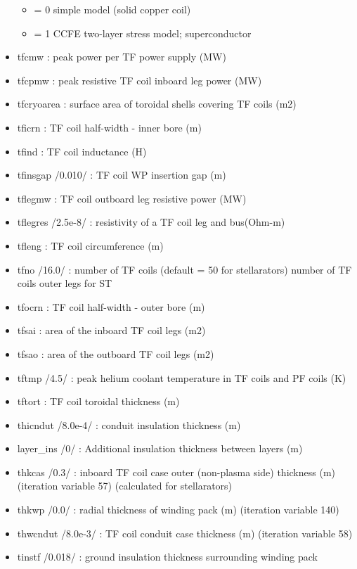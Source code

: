 \documentclass[]{article}
\providecommand{\tightlist}{%
  \setlength{\itemsep}{0pt}\setlength{\parskip}{0pt}}
\begin{document}
\begin{itemize}
  \begin{itemize}
  \tightlist
  \item
    = 0 simple model (solid copper coil)
  \item
    = 1 CCFE two-layer stress model; superconductor
  \end{itemize}
\item
  tfcmw : peak power per TF power supply (MW)
\item
  tfcpmw : peak resistive TF coil inboard leg power (MW)
\item
  tfcryoarea : surface area of toroidal shells covering TF coils (m2)
\item
  tficrn : TF coil half-width - inner bore (m)
\item
  tfind : TF coil inductance (H)
\item
  tfinsgap /0.010/ : TF coil WP insertion gap (m)
\item
  tflegmw : TF coil outboard leg resistive power (MW)
\item
  tflegres /2.5e-8/ : resistivity of a TF coil leg and bus(Ohm-m)
\item
  tfleng : TF coil circumference (m)
\item
  tfno /16.0/ : number of TF coils (default = 50 for stellarators)
  number of TF coils outer legs for ST
\item
  tfocrn : TF coil half-width - outer bore (m)
\item
  tfsai : area of the inboard TF coil legs (m2)
\item
  tfsao : area of the outboard TF coil legs (m2)
\item
  tftmp /4.5/ : peak helium coolant temperature in TF coils and PF coils
  (K)
\item
  tftort : TF coil toroidal thickness (m)
\item
  thicndut /8.0e-4/ : conduit insulation thickness (m)
\item
  layer\_ins /0/ : Additional insulation thickness between layers (m)
\item
  thkcas /0.3/ : inboard TF coil case outer (non-plasma side) thickness
  (m) (iteration variable 57) (calculated for stellarators)
\item
  thkwp /0.0/ : radial thickness of winding pack (m) (iteration variable
  140)
\item
  thwcndut /8.0e-3/ : TF coil conduit case thickness (m) (iteration
  variable 58)
\item
  tinstf /0.018/ : ground insulation thickness surrounding winding pack

\end{itemize}
\end{document}
